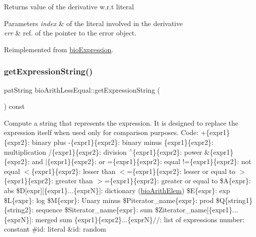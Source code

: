 \begin{DoxyReturn}{Returns}
value of the derivative w.\+r.\+t literal 
\end{DoxyReturn}

\begin{DoxyParams}{Parameters}
{\em index} & of the literal involved in the derivative \\
\hline
{\em err} & ref. of the pointer to the error object. \\
\hline
\end{DoxyParams}


Reimplemented from \hyperlink{classbio_expression_a5915579d1193f25f216c1e273c97f2ce}{bio\+Expression}.

\mbox{\label{classbio_arith_less_equal_a82a5b4eeb77747bc674fbc16453f9d67}} 
\subsubsection{\texorpdfstring{get\+Expression\+String()}{getExpressionString()}}
{\footnotesize\ttfamily pat\+String bio\+Arith\+Less\+Equal\+::get\+Expression\+String (\begin{DoxyParamCaption}{ }\end{DoxyParamCaption}) const\hspace{0.3cm}{\ttfamily [virtual]}}

Compute a string that represents the expression. It is designed to replace the expression itself when used only for comparison purposes. Code\+: +\{expr1\}\{expr2\}\+: binary plus -\/\{expr1\}\{expr2\}\+: binary minus \{expr1\}\{expr2\}\+: multiplication /\{expr1\}\{expr2\}\+: division $^\wedge$\{expr1\}\{expr2\}\+: power \&\{expr1\}\{expr2\}\+: and $\vert$\{expr1\}\{expr2\}\+: or =\{expr1\}\{expr2\}\+: equal !=\{expr1\}\{expr2\}\+: not equal $<$\{expr1\}\{expr2\}\+: lesser than $<$=\{expr1\}\{expr2\}\+: lesser or equal to $>$\{expr1\}\{expr2\}\+: greater than $>$=\{expr1\}\{expr2\}\+: greater or equal to \$A\{expr\}\+: abs \$D\mbox{[}expr\mbox{]}\mbox{[}\{expr1\}...\{exprN\}\mbox{]}\+: dictionary (\hyperlink{classbio_arith_elem}{bio\+Arith\+Elem}) \$E\{expr\}\+: exp \$L\{expr\}\+: log \$M\{expr\}\+: Unary minus \$\+Piterator\+\_\+name\{expr\}\+: prod \$Q\{string1\}\{string2\}\+: sequence \$\+Siterator\+\_\+name\{expr\}\+: sum \$\+Ziterator\+\_\+name\mbox{[}\{expr1\}...\{exprN\}\mbox{]}\+: merged sum \{expr1\}\{expr2\}...\{exprN\}//\+: list of expressions number\+: constant \#id\+: literal \&id\+: random 

